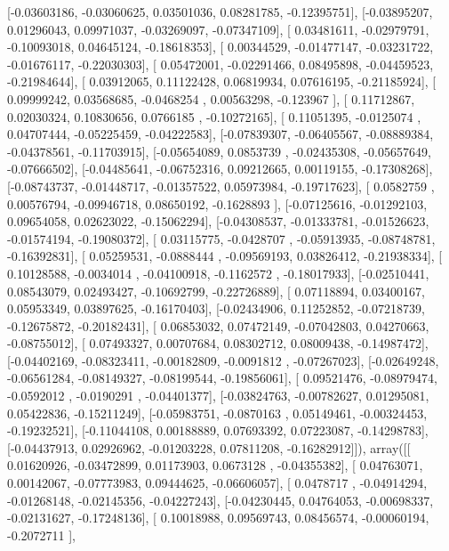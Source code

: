 \documentclass{article}
\begin{document}
       [-0.03603186, -0.03060625,  0.03501036,  0.08281785, -0.12395751],
       [-0.03895207,  0.01296043,  0.09971037, -0.03269097, -0.07347109],
       [ 0.03481611, -0.02979791, -0.10093018,  0.04645124, -0.18618353],
       [ 0.00344529, -0.01477147, -0.03231722, -0.01676117, -0.22030303],
       [ 0.05472001, -0.02291466,  0.08495898, -0.04459523, -0.21984644],
       [ 0.03912065,  0.11122428,  0.06819934,  0.07616195, -0.21185924],
       [ 0.09999242,  0.03568685, -0.0468254 ,  0.00563298, -0.123967  ],
       [ 0.11712867,  0.02030324,  0.10830656,  0.0766185 , -0.10272165],
       [ 0.11051395, -0.0125074 ,  0.04707444, -0.05225459, -0.04222583],
       [-0.07839307, -0.06405567, -0.08889384, -0.04378561, -0.11703915],
       [-0.05654089,  0.0853739 , -0.02435308, -0.05657649, -0.07666502],
       [-0.04485641, -0.06752316,  0.09212665,  0.00119155, -0.17308268],
       [-0.08743737, -0.01448717, -0.01357522,  0.05973984, -0.19717623],
       [ 0.0582759 ,  0.00576794, -0.09946718,  0.08650192, -0.1628893 ],
       [-0.07125616, -0.01292103,  0.09654058,  0.02623022, -0.15062294],
       [-0.04308537, -0.01333781, -0.01526623, -0.01574194, -0.19080372],
       [ 0.03115775, -0.0428707 , -0.05913935, -0.08748781, -0.16392831],
       [ 0.05259531, -0.0888444 , -0.09569193,  0.03826412, -0.21938334],
       [ 0.10128588, -0.0034014 , -0.04100918, -0.1162572 , -0.18017933],
       [-0.02510441,  0.08543079,  0.02493427, -0.10692799, -0.22726889],
       [ 0.07118894,  0.03400167,  0.05953349,  0.03897625, -0.16170403],
       [-0.02434906,  0.11252852, -0.07218739, -0.12675872, -0.20182431],
       [ 0.06853032,  0.07472149, -0.07042803,  0.04270663, -0.08755012],
       [ 0.07493327,  0.00707684,  0.08302712,  0.08009438, -0.14987472],
       [-0.04402169, -0.08323411, -0.00182809, -0.0091812 , -0.07267023],
       [-0.02649248, -0.06561284, -0.08149327, -0.08199544, -0.19856061],
       [ 0.09521476, -0.08979474, -0.0592012 , -0.0190291 , -0.04401377],
       [-0.03824763, -0.00782627,  0.01295081,  0.05422836, -0.15211249],
       [-0.05983751, -0.0870163 ,  0.05149461, -0.00324453, -0.19232521],
       [-0.11044108,  0.00188889,  0.07693392,  0.07223087, -0.14298783],
       [-0.04437913,  0.02926962, -0.01203228,  0.07811208, -0.16282912]]), array([[ 0.01620926, -0.03472899,  0.01173903,  0.0673128 , -0.04355382],
       [ 0.04763071,  0.00142067, -0.07773983,  0.09444625, -0.06606057],
       [ 0.0478717 , -0.04914294, -0.01268148, -0.02145356, -0.04227243],
       [-0.04230445,  0.04764053, -0.00698337, -0.02131627, -0.17248136],
       [ 0.10018988,  0.09569743,  0.08456574, -0.00060194, -0.2072711 ],
\end{document}
